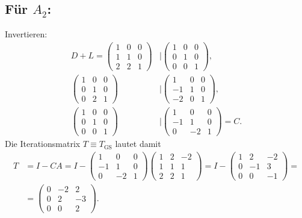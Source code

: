 \documentclass[english, parskip=full]{scrartcl}
\begin{document}
\subsection*{Für $A_2$:}
Invertieren: 
\begin{align}
D+L = \begin{pmatrix}
1 & 0 & 0 \\ 1 & 1 & 0 \\ 2 & 2 & 1
\end{pmatrix} &\Bigg\vert \begin{pmatrix}
1 & 0 & 0 \\ 0 & 1 & 0 \\ 0 & 0 & 1
\end{pmatrix},\\
\begin{pmatrix}
1 & 0 & 0 \\ 0 & 1 & 0 \\ 0 & 2 & 1
\end{pmatrix} &\Bigg\vert \begin{pmatrix}
1 & 0 & 0 \\ -1 & 1 & 0 \\ -2 & 0 & 1
\end{pmatrix},\\
\begin{pmatrix}
1 & 0 & 0 \\ 0 & 1 & 0 \\ 0 & 0 & 1
\end{pmatrix} &\Bigg\vert \begin{pmatrix}
1 & 0 & 0 \\ -1 & 1 & 0 \\ 0 & -2 & 1
\end{pmatrix} = C.
\end{align}
Die Iterationsmatrix $T\equiv T_\text{GS}$ lautet damit
\begin{align}
T &= I - CA = I - \begin{pmatrix}
1 & 0 & 0 \\ -1 & 1 & 0 \\ 0 & -2 & 1
\end{pmatrix}\begin{pmatrix}
1 & 2 & -2 \\ 1 & 1 & 1 \\ 2 & 2 & 1
\end{pmatrix} = I - \begin{pmatrix}
1 & 2 & -2 \\ 0 & -1 & 3 \\ 0 & 0 & -1
\end{pmatrix} = \\
&= \begin{pmatrix}
0 & -2 & 2 \\ 0 & 2 & -3 \\ 0 & 0 & 2
\end{pmatrix}.
\end{align}
\end{document}
